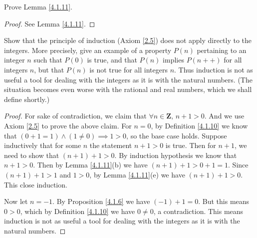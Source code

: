 \begin{exercise}\label{ex 4.1.7}
    Prove Lemma \ref{4.1.11}.
\end{exercise}

\begin{proof}
    See Lemma \ref{4.1.11}.
\end{proof}

\begin{exercise}\label{ex 4.1.8}
    Show that the principle of induction (Axiom \ref{2.5}) does not apply directly to the integers.
    More precisely, give an example of a property \(P(n)\) pertaining to an integer \(n\) such that \(P(0)\) is true, and that \(P(n)\) implies \(P(n++)\) for all integers \(n\), but that \(P(n)\) is not true for all integers \(n\).
    Thus induction is not as useful a tool for dealing with the integers as it is with the natural numbers.
    (The situation becomes even worse with the rational and real numbers, which we shall define shortly.)
\end{exercise}

\begin{proof}
    For sake of contradiction, we claim that \(\forall n \in \mathbf{Z}\), \(n + 1 > 0\).
    And we use Axiom \ref{2.5} to prove the above claim.
    For \(n = 0\), by Definition \ref{4.1.10} we know that \((0 + 1 = 1) \land (1 \neq 0) \implies 1 > 0\), so the base case holds.
    Suppose inductively that for some \(n\) the statement \(n + 1 > 0\) is true.
    Then for \(n + 1\), we need to show that \((n + 1) + 1 > 0\).
    By induction hypothesis we know that \(n + 1 > 0\).
    Then by Lemma \ref{4.1.11}(b) we have \((n + 1) + 1 > 0 + 1 = 1\).
    Since \((n + 1) + 1 > 1\) and \(1 > 0\), by Lemma \ref{4.1.11}(e) we have \((n + 1) + 1 > 0\).
    This close induction.

    Now let \(n = -1\).
    By Proposition \ref{4.1.6} we have \((-1) + 1 = 0\).
    But this means \(0 > 0\), which by Definition \ref{4.1.10} we have \(0 \neq 0\), a contradiction.
    This means induction is not as useful a tool for dealing with the integers as it is with the natural numbers.
\end{proof}
